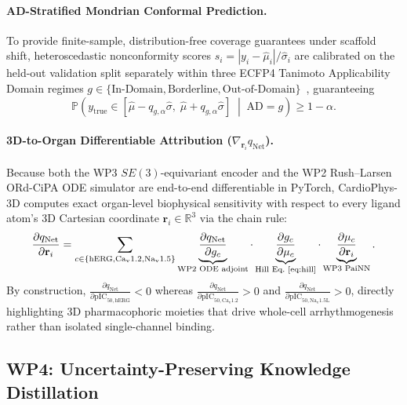 \documentclass[10pt,twocolumn,letterpaper]{article}
\newcommand{\qnet}{q_{\mathrm{Net}}}
\begin{document}
\paragraph{AD-Stratified Mondrian Conformal Prediction.}
To provide finite-sample, distribution-free coverage guarantees under scaffold shift, heteroscedastic nonconformity scores $s_i = |y_i - \hat{\mu}_i| / \hat{\sigma}_i$ are calibrated on the held-out validation split separately within three ECFP4 Tanimoto Applicability Domain regimes $g \in \{\text{In-Domain}, \text{Borderline}, \text{Out-of-Domain}\}$~\cite{vovk2005algorithmic,romano2019conformalized}, guaranteeing
\begin{equation}
  \mathbb{P}\!\left(y_{\mathrm{true}} \in [\hat{\mu} - q_{g,\alpha}\hat{\sigma},\; \hat{\mu} + q_{g,\alpha}\hat{\sigma}] \;\middle|\; \mathrm{AD} = g\right) \ge 1 - \alpha.
  \label{eq:mondrian}
\end{equation}

\paragraph{3D-to-Organ Differentiable Attribution ($\nabla_{\mathbf{r}_i}\qnet$).}
Because both the WP3 $SE(3)$-equivariant encoder and the WP2 Rush--Larsen ORd-CiPA ODE simulator are end-to-end differentiable in PyTorch, CardioPhys-3D computes exact organ-level biophysical sensitivity with respect to every ligand atom's 3D Cartesian coordinate $\mathbf{r}_i \in \mathbb{R}^3$ via the chain rule:
\begin{equation}
  \frac{\partial \qnet}{\partial \mathbf{r}_i}
  = \sum_{c \in \{\mathrm{hERG}, \mathrm{Ca_v1.2}, \mathrm{Na_v1.5}\}}
  \underbrace{\frac{\partial \qnet}{\partial g_c}}_{\text{WP2 ODE adjoint}}
  \cdot
  \underbrace{\frac{\partial g_c}{\partial \mu_c}}_{\text{Hill Eq.~\eqref{eq:hill}}}
  \cdot
  \underbrace{\frac{\partial \mu_c}{\partial \mathbf{r}_i}}_{\text{WP3 PaiNN}}.
  \label{eq:attribution}
\end{equation}
By construction, $\frac{\partial \qnet}{\partial \mathrm{pIC}_{50,\mathrm{hERG}}} < 0$ whereas $\frac{\partial \qnet}{\partial \mathrm{pIC}_{50,\mathrm{Ca_v1.2}}} > 0$ and $\frac{\partial \qnet}{\partial \mathrm{pIC}_{50,\mathrm{Na_v1.5L}}} > 0$, directly highlighting 3D pharmacophoric moieties that drive whole-cell arrhythmogenesis rather than isolated single-channel binding.

\subsection{WP4: Uncertainty-Preserving Knowledge Distillation}
\label{sec:wp4}
\end{document}
